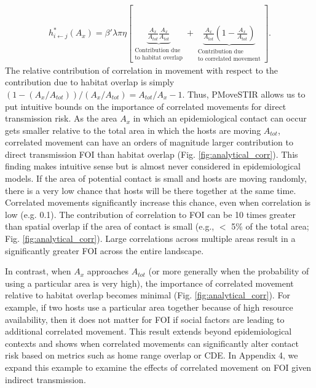 \documentclass[letterpaper]{article}
\begin{document}
\begin{equation}
    \begin{aligned}
        h^*_{i \leftarrow j}(A_x) = \beta' \lambda \pi \eta \left[\underbrace{\frac{A_x}{A_{tot}}\frac{A_x}{A_{tot}}}_{\substack{\text{Contribution due} \\  \text{to habitat overlap}}} + \underbrace{\frac{A_x}{A_{tot}}(1 - \frac{A_x}{A_{tot}})}_{\substack{\text{Contribution due} \\ \text{to correlated movement}}} \right].
    \end{aligned}
    \label{eq:uniform_direct}
\end{equation}
The relative contribution of correlation in movement with respect to the contribution due to habitat overlap is simply $(1 - (A_x / A_{tot})) / (A_x / A_{tot})=A_{tot}/A_x-1$. 
Thus, PMoveSTIR allows us to put intuitive bounds on the importance of correlated movements for direct transmission risk. 
As the area $A_x$ in which an epidemiological contact can occur gets smaller relative to the total area in which the hosts are moving $A_{tot}$, correlated movement can have an orders of magnitude larger contribution to direct transmission FOI than habitat overlap (Fig. \ref{fig:analytical_corr}). 
This finding makes intuitive sense but is almost never considered in epidemiological models. If the area of potential contact is small and hosts are moving randomly, there is a very low chance that hosts will be there together at the same time. Correlated movements significantly increase this chance, even when correlation is low (e.g. 0.1). The contribution of correlation to FOI can be 10 times greater than spatial overlap if the area of contact is small (e.g., $<$ 5\% of the total area; Fig. \ref{fig:analytical_corr}). Large correlations across multiple areas result in a significantly greater FOI across the entire landscape. 

In contrast, when $A_x$ approaches $A_{tot}$ (or more generally when the probability of using a particular area is very high), the importance of correlated movement relative to habitat overlap becomes minimal (Fig. \ref{fig:analytical_corr}). For example, if two hosts use a particular area together because of high resource availability, then it does not matter for FOI if social factors are leading to additional correlated movement. This result extends beyond epidemiological contexts and shows when correlated movements can significantly alter contact risk based on metrics such as home range overlap or CDE.  In Appendix 4, we expand this example to examine the effects of correlated movement on FOI given indirect transmission.
\end{document}
